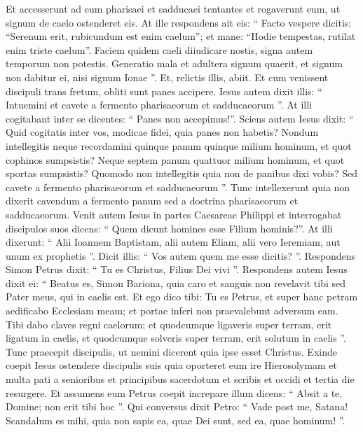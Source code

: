 \begin{biblechapter}
\begin{biblechapter}
\begin{biblechapter}
\begin{biblechapter}
\begin{biblechapter}
\begin{biblechapter}
\begin{biblechapter}
\begin{biblechapter}
\begin{biblechapter}
\begin{biblechapter}
\begin{biblechapter}
\begin{biblechapter}
\begin{biblechapter}
\begin{biblechapter}
\begin{biblechapter}
\begin{biblechapter}
\verse Et accesserunt ad eum pharisaei et sadducaei tentantes et rogaverunt eum, ut signum de caelo ostenderet eis. 
\verse At ille respondens ait eis: “ Facto vespere dicitis: “Serenum erit, rubicundum est enim caelum”; 
\verse et mane: “Hodie tempestas, rutilat enim triste caelum”. Faciem quidem caeli diiudicare nostis, signa autem temporum non potestis. 
\verse Generatio mala et adultera signum quaerit, et signum non dabitur ei, nisi signum Ionae ”. Et, relictis illis, abiit.
 \verse Et cum venissent discipuli trans fretum, obliti sunt panes accipere. 
\verse Iesus autem dixit illis: “ Intuemini et cavete a fermento pharisaeorum et sadducaeorum ”. 
\verse At illi cogitabant inter se dicentes: “ Panes non accepimus!”. 
\verse Sciens autem Iesus dixit: “ Quid cogitatis inter vos, modicae fidei, quia panes non habetis? 
\verse Nondum intellegitis neque recordamini quinque panum quinque milium hominum, et quot cophinos sumpsistis? 
\verse Neque septem panum quattuor milium hominum, et quot sportas sumpsistis? 
\verse Quomodo non intellegitis quia non de panibus dixi vobis? Sed cavete a fermento pharisaeorum et sadducaeorum ”. 
\verse Tunc intellexerunt quia non dixerit cavendum a fermento panum sed a doctrina pharisaeorum et sadducaeorum.
 \verse Venit autem Iesus in partes Caesareae Philippi et interrogabat discipulos suos dicens: “ Quem dicunt homines esse Filium hominis?”. 
\verse At illi dixerunt: “ Alii Ioannem Baptistam, alii autem Eliam, alii vero Ieremiam, aut unum ex prophetis ”. 
\verse Dicit illis: “ Vos autem quem me esse dicitis? ”. 
\verse Respondens Simon Petrus dixit: “ Tu es Christus, Filius Dei vivi ”. 
 \verse Respondens autem Iesus dixit ei: “ Beatus es, Simon Bariona, quia caro et sanguis non revelavit tibi sed Pater meus, qui in caelis est. 
\verse Et ego dico tibi: Tu es Petrus, et super hanc petram aedificabo Ecclesiam meam; et portae inferi non praevalebunt adversum eam. 
\verse Tibi dabo claves regni caelorum; et quodcumque ligaveris super terram, erit ligatum in caelis, et quodcumque solveris super terram, erit solutum in caelis ”. 
\verse Tunc praecepit discipulis, ut nemini dicerent quia ipse esset Christus.
 \verse Exinde coepit Iesus ostendere discipulis suis quia oporteret eum ire Hierosolymam et multa pati a senioribus et principibus sacerdotum et scribis et occidi et tertia die resurgere. 
\verse Et assumens eum Petrus coepit increpare illum dicens: “ Absit a te, Domine; non erit tibi hoc ”. 
\verse Qui conversus dixit Petro: “ Vade post me, Satana! Scandalum es mihi, quia non sapis ea, quae Dei sunt, sed ea, quae hominum! ”.

\end{biblechapter}
\end{biblechapter}
\end{biblechapter}
\end{biblechapter}
\end{biblechapter}
\end{biblechapter}
\end{biblechapter}
\end{biblechapter}
\end{biblechapter}
\end{biblechapter}
\end{biblechapter}
\end{biblechapter}
\end{biblechapter}
\end{biblechapter}
\end{biblechapter}
\end{biblechapter}
